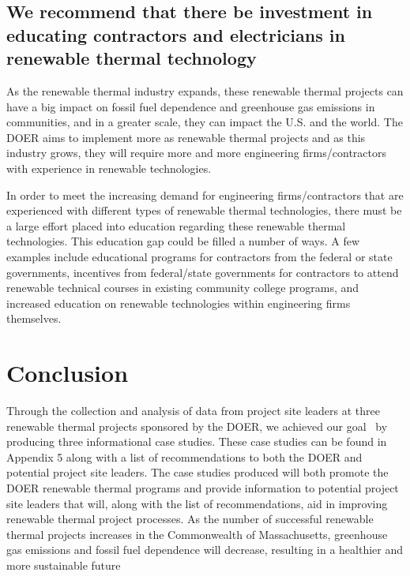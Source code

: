 \subsection{We recommend that there be investment in educating contractors and electricians in renewable thermal technology}
\par As the renewable thermal industry expands, these renewable thermal projects can have a big impact on fossil fuel dependence and greenhouse gas emissions in communities, and in a greater scale, they can impact the U.S. and the world. The DOER aims to implement more as renewable thermal projects and as this industry grows, they will require more and more engineering firms/contractors with experience in renewable technologies.
\par In order to meet the increasing demand for engineering firms/contractors that are experienced with different types of renewable thermal technologies, there must be a large effort placed into education regarding these renewable thermal technologies. This education gap could be filled a number of ways. A few examples include educational programs for contractors from the federal or state governments, incentives from federal/state governments for contractors to attend renewable technical courses in existing community college programs, and increased education on renewable technologies within engineering firms themselves.

\section{Conclusion}
\par Through the collection and analysis of data from project site leaders at three renewable thermal projects sponsored by the DOER, we achieved our goal \goal~by producing three informational case studies. These case studies can be found in Appendix 5 along with a list of recommendations to both the DOER and potential project site leaders. The case studies produced will both promote the DOER renewable thermal programs and provide information to potential project site leaders that will, along with the list of recommendations, aid in improving renewable thermal project processes. As the number of successful renewable thermal projects increases in the Commonwealth of Massachusetts, greenhouse gas emissions and fossil fuel dependence will decrease, resulting in a healthier and more sustainable future

